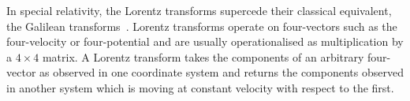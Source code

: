 \documentclass[ijoc,nonblindrev]{informs3} %
\begin{document}
\maketitle

%





\newcommand{\bu}{\mathbf u}
\newcommand{\bv}{\mathbf v}
\newcommand{\bw}{\mathbf w}
\newcommand{\bx}{\mathbf x}
\newcommand{\by}{\mathbf y}

\newcommand{\gyr}[2]{\operatorname{gyr}\left[{\mathbf #1},{\mathbf #2}\right]}


In special relativity, the Lorentz transforms supercede their
classical equivalent, the Galilean transforms~\citep{goldstein1980}.
Lorentz transforms operate on four-vectors such as the four-velocity
or four-potential and are usually operationalised as multiplication by
a $4\times 4$ matrix.  A Lorentz transform takes the components of an
arbitrary four-vector as observed in one coordinate system and returns
the components observed in another system which is moving at constant
velocity with respect to the first.
\end{document}

